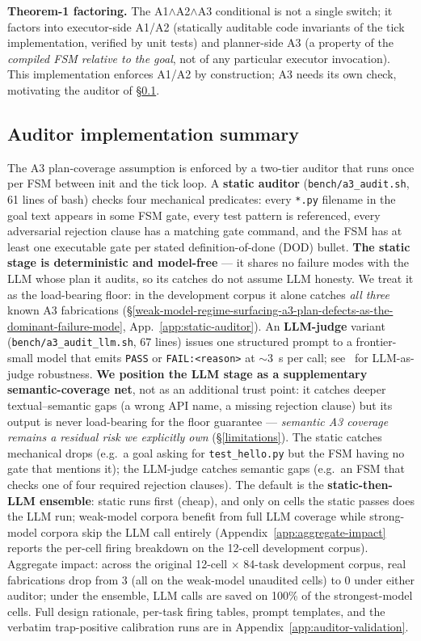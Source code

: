 \textbf{Theorem-1 factoring.} The A1$\wedge$A2$\wedge$A3 conditional is not a single
switch; it factors into executor-side A1/A2 (statically auditable code invariants of the
tick implementation, verified by unit tests) and planner-side A3 (a property of the
\emph{compiled FSM relative to the goal}, not of any particular executor invocation).
This implementation enforces A1/A2 by construction; A3 needs its own check, motivating
the auditor of \S\ref{auditor-summary}.

\subsection{Auditor implementation summary}\label{auditor-summary}

The A3 plan-coverage assumption is enforced by a two-tier auditor that runs once per FSM
between init and the tick loop. A \textbf{static auditor} (\texttt{bench/a3\_audit.sh},
61 lines of bash) checks four mechanical predicates: every \texttt{*.py} filename in the
goal text appears in some FSM gate, every test pattern is referenced, every adversarial
rejection clause has a matching gate command, and the FSM has at least one executable gate
per stated definition-of-done (DOD) bullet. \textbf{The static stage is deterministic and
model-free} --- it shares no failure modes with the LLM whose plan it audits, so its catches
do not assume LLM honesty. We treat it as the load-bearing floor: in the development corpus
it alone catches \emph{all three} known A3 fabrications (\S\ref{weak-model-regime-surfacing-a3-plan-defects-as-the-dominant-failure-mode},
App.~\ref{app:static-auditor}). An \textbf{LLM-judge} variant (\texttt{bench/a3\_audit\_llm.sh},
67 lines) issues one structured prompt to a frontier-small model that emits \texttt{PASS}
or \texttt{FAIL:\textless{}reason\textgreater{}} at $\sim$3~s per call; see~\citet{zheng2023judge}
for LLM-as-judge robustness. \textbf{We position the
LLM stage as a supplementary semantic-coverage net}, not as an additional trust point: it
catches deeper textual--semantic gaps (a wrong API name, a missing rejection clause) but
its output is never load-bearing for the floor guarantee --- \emph{semantic A3 coverage remains
a residual risk we explicitly own} (\S\ref{limitations}). The static
catches mechanical drops (e.g.\ a goal asking for \texttt{test\_hello.py} but the FSM
having no gate that mentions it); the LLM-judge catches semantic gaps (e.g.\ an FSM that
checks one of four required rejection clauses). The default is the
\textbf{static-then-LLM ensemble}: static runs first (cheap), and only on cells the static
passes does the LLM run; weak-model corpora benefit from full LLM coverage while strong-model
corpora skip the LLM call entirely (Appendix~\ref{app:aggregate-impact} reports the per-cell
firing breakdown on the 12-cell development corpus). Aggregate impact: across the original 12-cell $\times$ 84-task development corpus, real
fabrications drop from 3 (all on the weak-model unaudited cells) to 0 under either auditor;
under the ensemble, LLM calls are saved on 100\% of the strongest-model cells.
Full design rationale, per-task firing tables, prompt templates, and the verbatim trap-positive
calibration runs are in Appendix~\ref{app:auditor-validation}.


